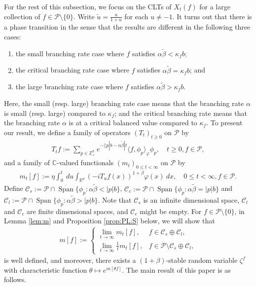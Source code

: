 \documentclass[12pt,a4paper]{amsart}
\theoremstyle{plain}
\theoremstyle{definition}
\numberwithin{equation}{section}
\begin{document}
For the rest of this subsection, we focus on the CLTs of $X_t(f)$ for a large collection of $f\in \mathcal P\setminus \{0\}$.
Write $\tilde u = \frac{u}{ 1+ u}$ for each $u \neq -1$.
It turns out that there is a phase transition in the sense that the results are different in the following three cases:
\begin{enumerate}
\item
  the small branching rate case where
$f$ satisfies $\alpha \tilde \beta < \kappa_f b$;
\item
  the critical branching rate case where
$f$ satisfies $\alpha \tilde \beta = \kappa_f b$; and
\item
  the large branching rate case  where
$f$ satisfies $\alpha \tilde \beta > \kappa_f b$.
\end{enumerate}
Here, the small (resp. large) branching rate case means that the branching rate $\alpha$ is small (resp. large) compared to $\kappa_f$;
 and the critical branching rate means that the branching rate $\alpha$ is at a critical balanced value compared to $\kappa_f$.
To present our result, we define a family of operators $(T_t)_{t\geq 0}$ on $\mathcal P$ by
\begin{align}
  \label{eq:I:R:1}
  T_t f
  := \sum_{p \in \mathbb Z_+^d} e^{-| |p|b - \alpha \tilde \beta |t} \langle f, \phi_p \rangle_{\varphi} \phi_p
  ,\quad t\geq 0, f\in \mathcal P,
\end{align}
and a family of $\mathbb C$-valued functionals $(m_t)_{0 \leq t < \infty}$ on $\mathcal P$ by
\begin{align}
  \label{eq:I:R:2}
  m_t[f]
  := \eta \int_0^t ~du \int_{\mathbb R^d} (-iT_u f(x))^{1+\beta} \varphi(x) ~dx
  , \quad 0 \leq t< \infty, f\in \mathcal P.
\end{align}
Define $ \mathcal C_s := \mathcal P \cap \overline{\operatorname{Span}} \{ \phi_p: \alpha \tilde \beta < |p| b \}$, $\mathcal C_c   := \mathcal P \cap \operatorname{Span} \{ \phi_p : \alpha \tilde \beta = |p| b \} $
and $ \mathcal C_l   := \mathcal P \cap \operatorname{Span} \{ \phi_p: \alpha \tilde \beta > |p| b \}$. 
Note that $\mathcal C_s$ is an infinite dimensional space, $ \mathcal C_l$ and $\mathcal C_c$
are finite dimensional spaces, and $\mathcal C_c$ might be empty.
For $f\in \mathcal P\setminus \{0\}$, in Lemma \ref{lem:m} and Proposition \ref{prop:PL:S} below, we will show that
\begin{align}
  \label{eq:I:R:3}
  m[f]
  := \begin{cases}
    \lim_{t\to \infty} m_t[f], &
    f \in \mathcal C_s \oplus \mathcal C_l, \\
    \lim_{t\to \infty} \frac{1}{t} m_t[f], & f\in \mathcal P \setminus \mathcal C_s \oplus \mathcal C_l,
  \end{cases}
\end{align}
is well defined, and moreover, there exists a $(1+\beta)$-stable random variable $\zeta^f$ with characteristic function $\theta \mapsto e^{m[\theta f]}$.
The main result of this paper is as follows.
\end{document}
